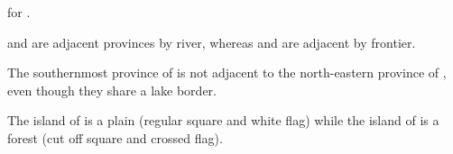 for \provinceBam.
\begin{exemple}
  \provinceNormandie and \provinceCaux are adjacent provinces by river,
  whereas \provinceNormandie and \provinceMaine are adjacent by frontier.

%
  The southernmost province of  is not adjacent to
  the north-eastern province of \granderegionIllinois, even though they share
  a lake border.

  The island of  is a plain (regular square and
  white flag) while the island of \provinceGuadeloupe is a forest (cut off
  square and crossed flag).
\end{exemple}



